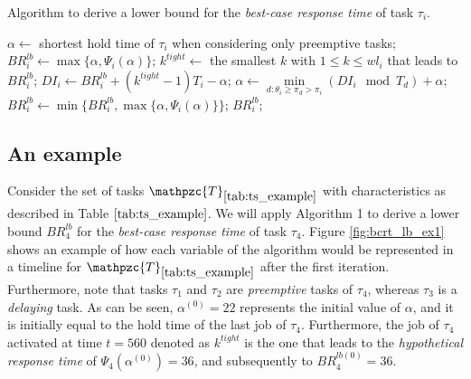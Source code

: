 \documentclass[fleqn]{article}
\begin{document}

\begin{algorithm}[H]
	\caption{Algorithm to derive a lower bound for the \textit{best-case response time} of task $\tau_i$.}\label{euclid}
	\begin{algorithmic}[1]
		\State $\alpha \gets$ shortest hold time of $\tau_i$ when considering only preemptive tasks;
		\State $BR^{lb}_i \gets \max\{\alpha, \Psi_i(\alpha) \}$;
		\State $k^{tight} \gets$ the smallest $k$ with $1 \leq k \leq wl_i$ that leads to $BR^{lb}_i$;
		\State $DI_i \gets BR^{lb}_i + (k^{tight}-1)T_i - \alpha$;
		\State $\alpha \gets \min \limits_{d:\theta_i \geq \pi_d > \pi_i} (DI_i \mod T_d) + \alpha$;
		\State $BR^{lb}_i \gets \min \{BR^{lb}_i, \max\{\alpha, \Psi_i(\alpha) \}\}$;
		\State \Return $BR^{lb}_i$; 
		\EndProcedure
	\end{algorithmic}
\end{algorithm}

\subsection{An example}
Consider the set of tasks $\mathpzc{T}_{\ref{tab:ts_example}}$ with characteristics as described in Table $\ref{tab:ts_example}$. We will apply Algorithm 1 to derive a lower bound $BR^{lb}_4$ for the \textit{best-case response time} of task $\tau_4$. Figure \ref{fig:bcrt_lb_ex1} shows an example of how each variable of the algorithm would be represented in a timeline for $\mathpzc{T}_{\ref{tab:ts_example}}$ after the first iteration. Furthermore, note that tasks $\tau_1$ and $\tau_2$ are \textit{preemptive} tasks of $\tau_4$, whereas $\tau_3$ is a \textit{delaying} task. As can be seen, $\alpha^{(0)}=22$ represents the initial value of $\alpha$, and it is initially equal to the hold time of the last job of $\tau_4$. Furthermore, the job of $\tau_4$ activated at time $t=560$ denoted as $k^{tight}$ is the one that leads to the \textit{hypothetical response time} of $\Psi_4(\alpha^{(0)})=36$, and subsequently to $BR_4^{lb(0)}=36$. 
\end{document}
